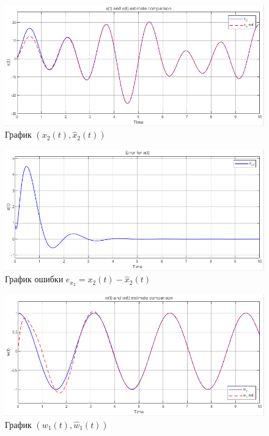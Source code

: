\documentclass[a4paper, 12pt]{article}
\begin{document}
    \begin{figure}[H]
        \centering
        \includegraphics[scale=0.75]{2task_x2.png}
        \captionsetup{skip=0pt}
        \caption{График $(x_2(t),\hat{x}_2(t))$}
        \label{fig:2task_x2}
    \end{figure}
    \begin{figure}[H]
        \centering
        \includegraphics[scale=0.75]{2task_ex2.png}
        \captionsetup{skip=0pt}
        \caption{График ошибки $e_{x_2}=x_2(t)-\hat{x}_2(t)$}
        \label{fig:2task_ex2}
    \end{figure}
    \begin{figure}[H]
        \centering
        \includegraphics[scale=0.75]{2task_w1.png}
        \captionsetup{skip=0pt}
        \caption{График $(w_1(t),\hat{w}_1(t))$}
        \label{fig:2task_w1}
    \end{figure}
\end{document}

